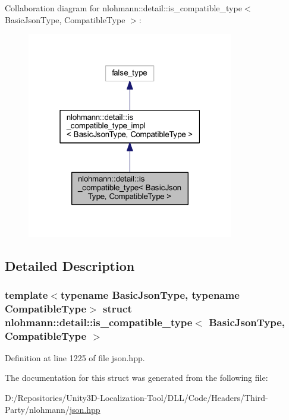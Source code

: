 Collaboration diagram for nlohmann\+::detail\+::is\+\_\+compatible\+\_\+type$<$ Basic\+Json\+Type, Compatible\+Type $>$\+:
\nopagebreak
\begin{figure}[H]
\begin{center}
\leavevmode
\includegraphics[width=256pt]{structnlohmann_1_1detail_1_1is__compatible__type__coll__graph}
\end{center}
\end{figure}


\subsection{Detailed Description}
\subsubsection*{template$<$typename Basic\+Json\+Type, typename Compatible\+Type$>$\newline
struct nlohmann\+::detail\+::is\+\_\+compatible\+\_\+type$<$ Basic\+Json\+Type, Compatible\+Type $>$}



Definition at line 1225 of file json.\+hpp.



The documentation for this struct was generated from the following file\+:\begin{DoxyCompactItemize}
\item 
D\+:/\+Repositories/\+Unity3\+D-\/\+Localization-\/\+Tool/\+D\+L\+L/\+Code/\+Headers/\+Third-\/\+Party/nlohmann/\mbox{\hyperlink{json_8hpp}{json.\+hpp}}\end{DoxyCompactItemize}
